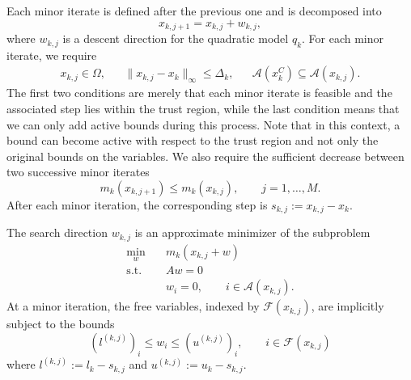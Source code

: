 \documentclass{article}
\numberwithin{equation}{section}
\newcommand{\calA}{{\mathcal{A}}}
\newcommand{\calF}{{\mathcal{F}}}
\theoremstyle{plain}
\begin{document}
	Each minor iterate is defined after the previous one and is decomposed into 
	\[x_{k,j+1}=x_{k,j}+w_{k,j},\]
	where $w_{k,j}$ is a descent direction for the quadratic model $q_k$. For each minor iterate, we require
	\begin{equation}\label{eq:minor_iterate_feasible}
		\begin{aligned}
			x_{k,j} \in \Omega, & & \|x_{k,j} - x_k \|_\infty \le \Delta_k, & & \calA(x_k^C) \subseteq \calA(x_{k,j}).
		\end{aligned}
	\end{equation}
	The first two conditions are merely that each minor iterate is feasible and the associated step lies within the trust region, while the last condition means that we can only add active bounds during this process. Note that in this context, a bound can become active with respect to the trust region and not only the original bounds on the variables.
	We also require the sufficient decrease between two successive minor iterates
	\begin{equation}\label{eq:minor_iterate_decrease}
		m_k(x_{k,j+1}) \le m_k(x_{k,j}), \qquad j = 1,\ldots,M.
	\end{equation}
	After each minor iteration, the corresponding step is $s_{k,j}:=x_{k,j}-x_k$.
	
	The search direction $w_{k,j}$ is an approximate minimizer of the subproblem
	\begin{subequations}\label{pb:minor_subpb}
		\begin{align}
			\min_w \quad & m_k(x_{k,j}+w) \\
			\text{s.t.} \quad & Aw=0 \label{subeq:minor_subpb_eq_cons} \\
			& w_i = 0, \qquad i \in \calA(x_{k,j}) \label{subeq:minor_subpb_fix_bounds}.
		\end{align}
	\end{subequations}
	At a minor iteration, the free variables, indexed by $\calF(x_{k,j})$, are implicitly subject to the bounds 
	\begin{equation}\label{subeq:minor_subpb_bounds}
		\left(l^{(k,j)}\right)_i \le w_i \le \left(u^{(k,j)}\right)_i, \qquad i \in \calF(x_{k,j})
	\end{equation}
	where $l^{(k,j)}:= l_k - s_{k,j}$ and $u^{(k,j)}:= u_k - s_{k,j}$.
	
\end{document}
